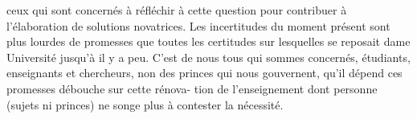 
ceux qui sont concernés à réfléchir à cette question pour contribuer à
l'élaboration de solutions novatrices. Les incertitudes du moment présent
sont plus lourdes de promesses que toutes les certitudes sur lesquelles se
reposait dame Université jusqu'à il y a peu. C'est de nous tous qui sommes
concernés, étudiants, enseignants et chercheurs, non des princes qui nous
gouvernent, qu'il dépend  ces promesses  débouche sur cette rénova-%
tion de l'enseignement dont personne (sujets ni princes) ne songe plus à
contester la nécessité.

